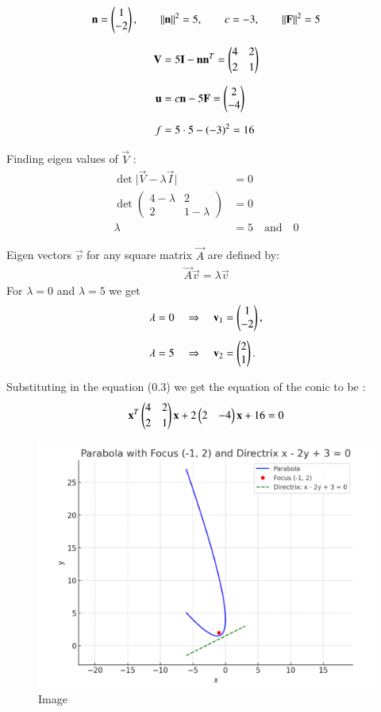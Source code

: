 \documentclass[journal]{IEEEtran}
\begin{document}
\[
\mathbf{n}=\begin{pmatrix}1\\-2\end{pmatrix},\qquad \|\mathbf{n}\|^2=5,\qquad c=-3,\qquad \|\mathbf{F}\|^2=5
\]

\begin{align}
   \mathbf{V} &= 5\mathbf{I} - \mathbf{n}\mathbf{n}^T
   = \begin{pmatrix}4 & 2\\[2pt] 2 & 1\end{pmatrix}\\[6pt]
   \mathbf{u} &= c\mathbf{n} - 5\mathbf{F}
   = \begin{pmatrix}2\\-4\end{pmatrix}\\[6pt]
   f &= 5\cdot 5 - (-3)^2 = 16
\end{align}

Finding eigen values of $\vec{V}$ :
\begin{align}
    \det\lvert \vec{V} - \lambda\vec{I} \rvert &= 0\\[4pt]
    \det\begin{pmatrix} 4 - \lambda & 2 \\[2pt] 2 & 1 - \lambda \end{pmatrix} &= 0\\[4pt]
    \lambda &= 5 \quad \text{and} \quad 0
\end{align}

Eigen vectors $\vec{v}$ for any square matrix $\vec{A}$ are defined by:
\begin{align}
    \vec{A}\vec{v} = \lambda\vec{v}
\end{align}
For $\lambda = 0$ and $\lambda=5$ we get
\begin{align}
    \lambda = 0 &\quad\Rightarrow\quad \mathbf{v}_1 = \begin{pmatrix}1\\-2\end{pmatrix},\\[4pt]
    \lambda = 5 &\quad\Rightarrow\quad \mathbf{v}_2 = \begin{pmatrix}2\\1\end{pmatrix}.
\end{align}

Substituting in the equation (0.3) we get the equation of the conic to be :
\begin{align}
  \mathbf{x}^{T}\begin{pmatrix}4 & 2\\[2pt] 2 & 1\end{pmatrix}\mathbf{x} + 2\begin{pmatrix}2 & -4\end{pmatrix}\mathbf{x} +16 =0
\end{align}

\begin{figure}[H]
    \centering
    \includegraphics[width=0.85\linewidth]{figs/image.png}
    \caption{Image}
    \label{fig:placeholder}
\end{figure}
\end{document}
